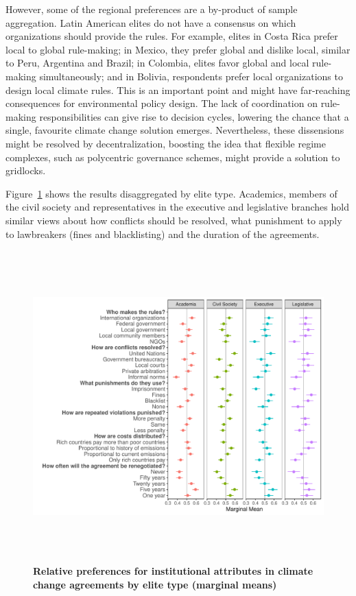\documentclass[a4paper,12pt]{article}
\begin{document}
However, some of the regional preferences are a by-product of sample aggregation. Latin American elites do not have a consensus on which organizations should provide the rules. For example, elites in Costa Rica prefer local to global rule-making; in Mexico, they prefer global and dislike local, similar to Peru, Argentina and Brazil; in Colombia, elites favor global and local rule-making simultaneously; and in Bolivia, respondents prefer local organizations to design local climate rules. This is an important point and might have far-reaching consequences for environmental policy design. The lack of coordination on rule-making responsibilities can give rise to decision cycles, lowering the chance that a single, favourite climate change solution emerges. Nevertheless, these dissensions might be resolved by decentralization, boosting the idea that flexible regime complexes, such as polycentric governance schemes, might provide a solution to gridlocks.

Figure~\ref{fig:types} shows the results disaggregated by elite type. Academics, members of the civil society and representatives in the executive and legislative branches hold similar views about how conflicts should be resolved, what punishment to apply to lawbreakers (fines and blacklisting) and the duration of the agreements.

\begin{figure}[H]
	\centering
	\includegraphics[height=12cm]{MM_membertype.pdf}
	\caption{\textbf{Relative preferences for institutional attributes in climate change agreements by elite type (marginal means)}}
	\label{fig:types}
\end{figure}
\end{document}
